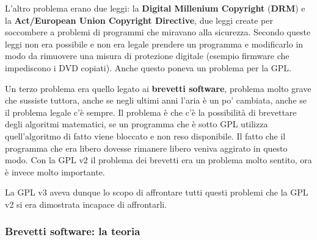 L'altro problema erano due leggi: la \textbf{Digital Millenium Copyright} (\textbf{DRM}) e la \textbf{Act/European Union Copyright Directive}, due leggi create per soccombere a problemi di programmi che miravano alla sicurezza. Secondo queste leggi non era possibile e non era legale prendere un programma e modificarlo in modo da rimuovere una misura di protezione digitale (esempio firmware che impediscono i DVD copiati). Anche questo poneva un problema per la GPL.

Un terzo problema era quello legato ai \textbf{brevetti software}, problema molto grave che sussiste tuttora, anche se negli ultimi anni l'aria è un po' cambiata, anche se il problema legale c'è sempre. Il problema è che c'è la possibilità di brevettare degli algoritmi matematici, se un programma che è sotto GPL utilizza quell'algoritmo di fatto viene bloccato e non reso disponibile. Il fatto che il programma che era libero dovesse rimanere libero veniva aggirato in questo modo. Con la GPL v2 il problema dei brevetti era un problema molto sentito, ora è invece molto importante. 

La GPL v3 aveva dunque lo scopo di affrontare tutti questi problemi che la GPL v2 si era dimostrata incapace di affrontarli. 

\subsubsection{Brevetti software: la teoria}